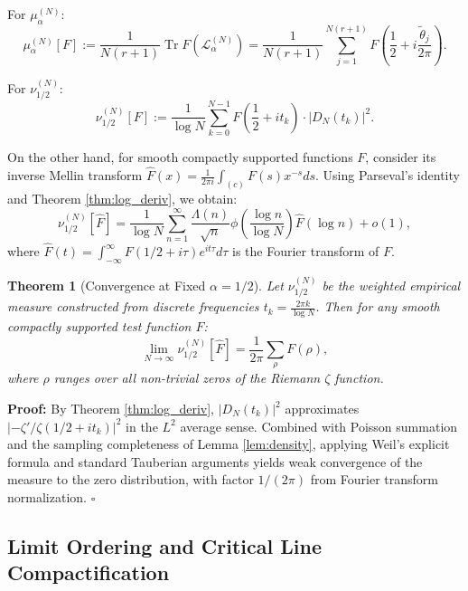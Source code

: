 \documentclass[12pt,a4paper]{amsart}
\theoremstyle{plain}
\newtheorem{theorem}{Theorem}[section]
\theoremstyle{definition}
\theoremstyle{remark}
\begin{document}
For $\mu_\alpha^{(N)}$:
\begin{equation}
\mu_\alpha^{(N)}[F] := \frac{1}{N(r+1)}\operatorname{Tr} F(\mathcal{L}_\alpha^{(N)}) = \frac{1}{N(r+1)}\sum_{j=1}^{N(r+1)} F\left(\frac{1}{2}+i\frac{\tilde{\theta}_j}{2\pi}\right).
\end{equation}

For $\nu_{1/2}^{(N)}$:
\begin{equation}
\nu_{1/2}^{(N)}[F] := \frac{1}{\log N}\sum_{k=0}^{N-1} F\left(\frac{1}{2}+it_k\right) \cdot |D_N(t_k)|^2.
\end{equation}

On the other hand, for smooth compactly supported functions $F$, consider its inverse Mellin transform $\hat{F}(x)=\frac{1}{2\pi i}\int_{(c)} F(s) x^{-s}ds$. Using Parseval's identity and Theorem \ref{thm:log_deriv}, we obtain:
\begin{equation}
\nu_{1/2}^{(N)}[\widehat{F}] = \frac{1}{\log N}\sum_{n=1}^\infty \frac{\Lambda(n)}{\sqrt{n}}\phi\left(\frac{\log n}{\log N}\right)\widehat{F}(\log n) + o(1),
\end{equation}
where $\widehat{F}(t) = \int_{-\infty}^\infty F(1/2+i\tau) e^{it\tau} d\tau$ is the Fourier transform of $F$.

\begin{theorem}[Convergence at Fixed $\alpha=1/2$]\label{thm:convergence}
Let $\nu_{1/2}^{(N)}$ be the weighted empirical measure constructed from discrete frequencies $t_k = \frac{2\pi k}{\log N}$. Then for any smooth compactly supported test function $F$:
\begin{equation}
\lim_{N\to\infty} \nu_{1/2}^{(N)}[\widehat{F}] = \frac{1}{2\pi} \sum_{\rho} F(\rho),
\end{equation}
where $\rho$ ranges over all non-trivial zeros of the Riemann $\zeta$ function.
\end{theorem}

\textbf{Proof:} By Theorem \ref{thm:log_deriv}, $|D_N(t_k)|^2$ approximates $|-\zeta'/\zeta(1/2+it_k)|^2$ in the $L^2$ average sense. Combined with Poisson summation and the sampling completeness of Lemma \ref{lem:density}, applying Weil's explicit formula and standard Tauberian arguments yields weak convergence of the measure to the zero distribution, with factor $1/(2\pi)$ from Fourier transform normalization. $\square$

\subsection{Limit Ordering and Critical Line Compactification}
\end{document}

